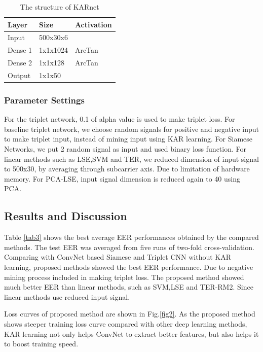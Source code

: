 \documentclass[runningheads]{llncs}
\begin{document}
\begin{table}[]
    \caption{The structure of KARnet}\label{tab2}
    \centering
    \begin{tabular}{|l|l|l|}
    \hline
    Layer   & Size     & Activation \\ \hline
    Input   & 500x30x6 &            \\
    Dense 1 & 1x1x1024 & ArcTan     \\
    Dense 2 & 1x1x128  & ArcTan     \\
    Output  & 1x1x50   &            \\ \hline
    \end{tabular}
\end{table}

\subsubsection{Parameter Settings}
For the triplet network, 0.1 of alpha value is used to make triplet loss.
For baseline triplet network, we choose random signals for positive and negative input to make triplet input, instead of mining input using KAR learning.
For Siamese Networks, we put 2 random signal as input and used binary loss function.
For linear methods such as LSE,SVM and TER, we reduced dimension of input signal to 500x30, by averaging through subcarrier axis. Due to limitation of hardware memory.
For PCA-LSE, input signal dimension is reduced again to 40 using PCA.

\subsection{Results and Discussion}

Table \ref{tab3} shows the best average EER performances obtained by the compared methods. The test EER was averaged from five runs of two-fold cross-validation.
Comparing with ConvNet based Siamese and Triplet CNN without KAR learning, proposed methods showed the best EER performance. Due to negative mining process included in making triplet loss.
The proposed method showed much better EER than linear methods, such as SVM,LSE and TER-RM2. Since linear methods use reduced input signal.

Loss curves of proposed method are shown in Fig.\ref{fig2}.
As the proposed method shows steeper training loss curve compared with other deep learning methods, KAR learning not only helps ConvNet to extract better features, but also helps it to boost training speed. 
\end{document}
